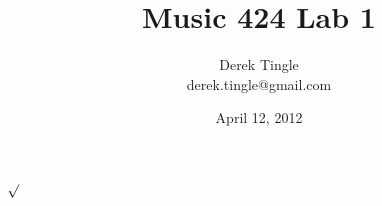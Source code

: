 \documentclass[12pt]{article}
\begin{document}
\title{Music 424 Lab 1}
\author{Derek Tingle\\ derek.tingle@gmail.com}
\date{April 12, 2012}
\maketitle

\section{}
\subsection{}
$\surd$

\subsection{}

\section{}

\section{}

\subsection{}
\end{document}
